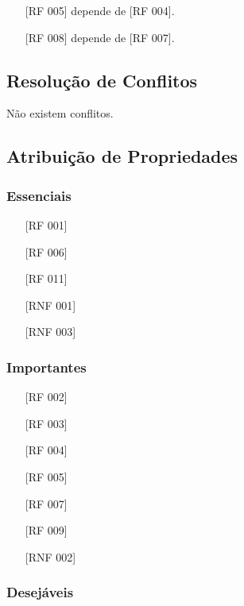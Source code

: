 \documentclass[ppginf, pep]{esinucpel}
\begin{document}
\begin{itemize}
\item[\textbullet] [RF 005] depende de [RF 004].
\item[\textbullet] [RF 008] depende de [RF 007].
\end{itemize}

\subsection{Resolução de Conflitos}

Não existem conflitos.

\subsection{Atribuição de Propriedades}

\subsubsection{Essenciais}

\begin{itemize}
\item[\textbullet] [RF 001]
\item[\textbullet] [RF 006]
\item[\textbullet] [RF 011]
\item[\textbullet] [RNF 001]
\item[\textbullet] [RNF 003]
\end{itemize}

\subsubsection{Importantes}

\begin{itemize}
\item[\textbullet] [RF 002]
\item[\textbullet] [RF 003]
\item[\textbullet] [RF 004]
\item[\textbullet] [RF 005]
\item[\textbullet] [RF 007]
\item[\textbullet] [RF 009]
\item[\textbullet] [RNF 002]
\end{itemize}

\subsubsection{Desejáveis}
\end{document}
